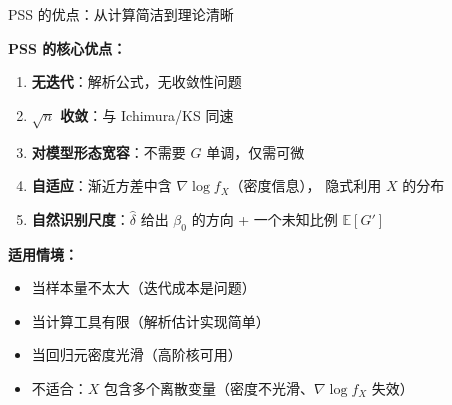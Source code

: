 \documentclass[aspectratio=169, 10pt]{beamer}
\begin{document}
\begin{frame}{PSS 的优点：从计算简洁到理论清晰}

  \begin{highlightbox}
    \textbf{PSS 的核心优点：}
    \begin{enumerate}\setlength{\itemsep}{1pt}
      \item \textbf{无迭代}：解析公式，无收敛性问题
      \item \textbf{$\sqrt{n}$ 收敛}：与 Ichimura/KS 同速
      \item \textbf{对模型形态宽容}：不需要 $G$ 单调，仅需可微
      \item \textbf{自适应}：渐近方差中含 $\nabla \log f_X$（密度信息），
      隐式利用 $X$ 的分布
      \item \textbf{自然识别尺度}：$\hat\delta$ 给出 $\beta_0$ 的方向 + 一个未知比例 $\mathbb{E}[G']$
    \end{enumerate}
  \end{highlightbox}

  \begin{keybox}
    \textbf{适用情境：}
    \begin{itemize}\setlength{\itemsep}{1pt}
      \item 当样本量不太大（迭代成本是问题）
      \item 当计算工具有限（解析估计实现简单）
      \item 当回归元密度光滑（高阶核可用）
      \item 不适合：$X$ 包含多个离散变量（密度不光滑、$\nabla \log f_X$ 失效）
    \end{itemize}
  \end{keybox}

\end{frame}
\end{document}
